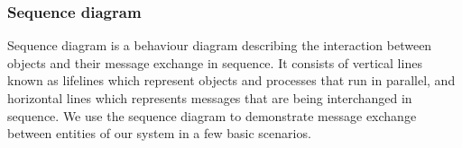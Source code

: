 \subsubsection{Sequence diagram}
Sequence diagram is a behaviour diagram describing the interaction between objects and their message exchange in sequence. It consists of vertical lines known as lifelines which represent objects and processes that run in parallel, and horizontal lines which represents messages that are being interchanged in sequence. We use the sequence diagram to demonstrate message exchange between entities of our system in a few basic scenarios.